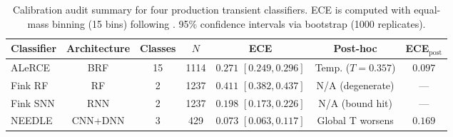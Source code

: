 \begin{table}
\centering
\caption{Calibration audit summary for four production transient classifiers. ECE is computed with equal-mass binning (15 bins) following \citet{roelofs2022}. 95\% confidence intervals via bootstrap (1000 replicates).}
\label{tab:summary}
\begin{tabular}{lcccccc}
\hline\hline
Classifier & Architecture & Classes & $N$ & ECE & Post-hoc & ECE$_\mathrm{post}$ \\
\hline
ALeRCE & BRF & 15 & 1114 & $0.271$ $[0.249, 0.296]$ & Temp. ($T=0.357$) & $0.097$ \\
Fink RF & RF & 2 & 1237 & $0.411$ $[0.382, 0.437]$ & N/A (degenerate) & --- \\
Fink SNN & RNN & 2 & 1237 & $0.198$ $[0.173, 0.226]$ & N/A (bound hit) & --- \\
NEEDLE & CNN+DNN & 3 & 429 & $0.073$ $[0.063, 0.117]$ & Global T worsens & $0.169$ \\
\hline
\end{tabular}
\end{table}
